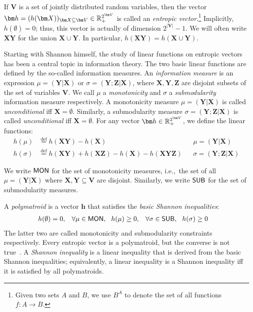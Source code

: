 \documentclass[10pt,a4paper]{article}
\newcommand{\defeq}{\stackrel{\text{def}}{=}}
\newcommand{\Rp}{{\mathbb R}_{\tiny +}} %
\newcommand{\mon}{\text{\sf MON}}
\newcommand{\sub}{\text{\sf SUB}}
\begin{document}
If $\bm V$ is a set of jointly distributed random variables, then the vector
$\bm h = (h(\bm X))_{\bm X \subseteq \bm V}\in\Rp^{2^{\bm V}}$ is called an
{\em entropic vector}.\footnote{Given two sets $A$ and $B$, we use
$B^A$ to denote the set of all functions $f:A\rightarrow B$.}
Implicitly, $h(\emptyset) = 0$; thus, this vector is actually of dimension $2^{|\bm V|}-1$.
We will often write $\bm X\bm Y$ for the union $\bm X \cup \bm Y$.
In particular, $h(\bm X \bm Y) = h(\bm X \cup\bm Y)$.

Starting with Shannon himself, the study of linear functions on entropic vectors has been a
central topic in information theory. The two basic linear functions are defined by the
so-called information measures. An {\em information measure} is an expression $\mu = (\bm
Y|\bm X)$ or $\sigma = (\bm Y; \bm Z|\bm X)$, where $\bm X, \bm Y, \bm Z$ are disjoint
subsets of the set of variables $\bm V$.  We call $\mu$ a {\em monotonicity} and $\sigma$ a
{\em submodularity} information measure respectively. A monotonicity measure $\mu = (\bm
Y|\bm X)$ is called {\em unconditional} iff $\bm X = \emptyset$. Similarly, a submodularity
measure $\sigma = (\bm Y;\bm Z|\bm X)$ is called {\em unconditional} iff $\bm X =
\emptyset$.
For any vector $\bm h \in
\Rp^{2^{\bm V}}$, we define the linear functions:
\begin{align*}
  h(\mu) & \defeq h(\bm X\bm Y) - h(\bm X) && \mu=(\bm Y|\bm X)\\
  h(\sigma) & \defeq h(\bm X\bm Y)+h(\bm X\bm Z)-h(\bm X)-h(\bm X\bm Y\bm Z)
    && \sigma=(\bm Y;\bm Z|\bm X)
\end{align*}
%

We write $\mon$ for the set of monotonicity measures, i.e.,~the set of all $\mu = (\bm Y|\bm X)$
where $\bm X,\bm Y\subseteq \bm V$ are disjoint.
Similarly, we write $\sub$ for the
set of submodularity measures.

A \emph{polymatroid} is a vector $\bm h$
that satisfies the {\em basic Shannon inequalities}:
%
\begin{align}
  h(\emptyset) &= 0,
  & \forall \mu \in \mon,\ \ h(\mu) &\geq 0,
  &\forall \sigma \in \sub,\ \ h(\sigma) & \geq 0
  \label{eq:shannon}
\end{align}
%
The latter two are called monotonicity and submodularity constraints respectively.
Every entropic vector is a polymatroid, but the converse is not
true~\cite{DBLP:journals/tit/ZhangY97}.
A {\em Shannon inequality} is a linear inequality that is derived from the
basic Shannon inequalities; equivalently, a linear inequality is a
Shannon inequality iff it is satisfied by all polymatroids.
\end{document}
